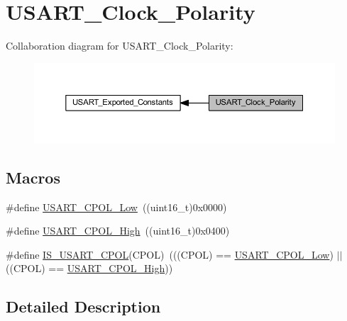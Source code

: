 \hypertarget{group___u_s_a_r_t___clock___polarity}{}\section{U\+S\+A\+R\+T\+\_\+\+Clock\+\_\+\+Polarity}
\label{group___u_s_a_r_t___clock___polarity}
Collaboration diagram for U\+S\+A\+R\+T\+\_\+\+Clock\+\_\+\+Polarity\+:
\nopagebreak
\begin{figure}[H]
\begin{center}
\leavevmode
\includegraphics[width=350pt]{group___u_s_a_r_t___clock___polarity}
\end{center}
\end{figure}
\subsection*{Macros}
\begin{DoxyCompactItemize}
\item 
\#define \hyperlink{group___u_s_a_r_t___clock___polarity_ga194d60b47d8042d39e843c52f3a6aa1a}{U\+S\+A\+R\+T\+\_\+\+C\+P\+O\+L\+\_\+\+Low}~((uint16\+\_\+t)0x0000)
\item 
\#define \hyperlink{group___u_s_a_r_t___clock___polarity_ga4ba6946dd9f0b4fd38115f24798c210f}{U\+S\+A\+R\+T\+\_\+\+C\+P\+O\+L\+\_\+\+High}~((uint16\+\_\+t)0x0400)
\item 
\#define \hyperlink{group___u_s_a_r_t___clock___polarity_ga833e9d2e85ab84658c7a7c18bd0bc8b9}{I\+S\+\_\+\+U\+S\+A\+R\+T\+\_\+\+C\+P\+OL}(C\+P\+OL)~(((C\+P\+OL) == \hyperlink{group___u_s_a_r_t___clock___polarity_ga194d60b47d8042d39e843c52f3a6aa1a}{U\+S\+A\+R\+T\+\_\+\+C\+P\+O\+L\+\_\+\+Low}) $\vert$$\vert$ ((C\+P\+OL) == \hyperlink{group___u_s_a_r_t___clock___polarity_ga4ba6946dd9f0b4fd38115f24798c210f}{U\+S\+A\+R\+T\+\_\+\+C\+P\+O\+L\+\_\+\+High}))
\end{DoxyCompactItemize}


\subsection{Detailed Description}


